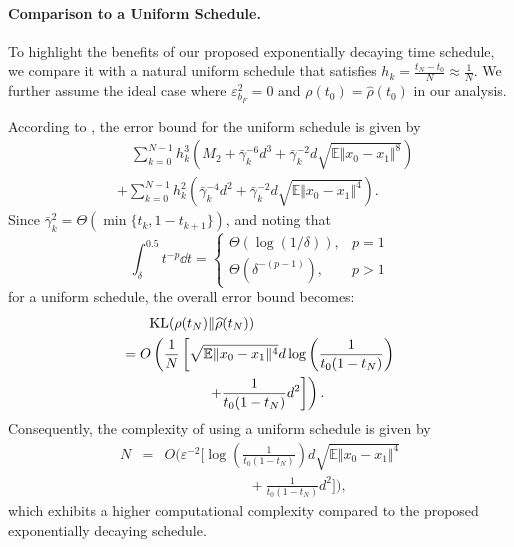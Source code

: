 \paragraph{Comparison to a Uniform Schedule.} 
To highlight the benefits of our proposed exponentially decaying time schedule, we compare it with a natural uniform schedule that satisfies $h_k = \frac{t_N - t_0}{N} \approx \frac{1}{N}$. 
We further assume the ideal case where  $\varepsilon_{b_F}^2=0$ and $\rho(t_0)=\hat{\rho}(t_0)$ in our analysis. 

According to , the error bound for the uniform schedule is given by
$$\begin{aligned}
    &\quad\sum_{k=0}^{N-1}h_k^3(M_2+\bar{\gamma}_k^{-6}d^3+\bar{\gamma}_k^{-2}d\sqrt{\mathbb{E}\Vert x_0-x_1\Vert^8})\\
    &+\sum_{k=0}^{N-1}h_k^2(\bar{\gamma}_k^{-4}d^2+\bar{\gamma}_k^{-2}d\sqrt{\mathbb{E}\Vert x_0-x_1\Vert^4}).
\end{aligned}$$
Since $\bar{\gamma}_k^2=\Theta(\min\{t_k,1-t_{k+1}\})$, and noting that $$\int_{\delta}^{0.5}t^{-p}\dd t=
\begin{cases}
    \Theta(\log(1/\delta)),&p=1\\
    \Theta(\delta^{-(p-1)}),&p>1
\end{cases}$$
for a uniform schedule, the overall error bound becomes:
$$\begin{aligned}
    &\qquad\textnormal{KL}(\rho(t_N)\Vert\hat{\rho}(t_N))\\&=O\left(\frac{1}{N}\left[\sqrt{\mathbb{E}\Vert x_0-x_1\Vert^4}d\log\left(\frac{1}{t_0(1-t_N)}\right)\right.\right.\\
    &\qquad\qquad\qquad\left.\left.+\frac{1}{t_0(1-t_N)}d^2\right]\right).
\end{aligned}$$
Consequently, the complexity of using a uniform schedule is given by 
\begin{eqnarray*}
N&=&O\bigg(\varepsilon^{-2}\bigg[\log\left(\frac{1}{t_0(1-t_N)}\right)d\sqrt{\mathbb{E}\Vert x_0-x_1\Vert^4}\\&& \qquad\qquad\qquad+\frac{1}{t_0(1-t_N)}d^2\bigg]\bigg),
\end{eqnarray*}
which exhibits a higher computational complexity compared to the proposed exponentially decaying schedule.


